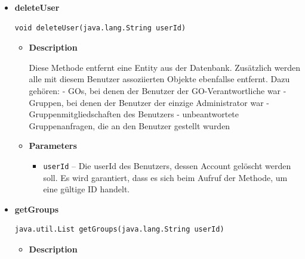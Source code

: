 \documentclass[11pt,a4paper]{report}
\begin{document}
{{{{{{{{{{{{\begin{itemize}
{\begin{itemize}
{Die Methode fügt eine neue UserEntity in die Datenbank ein.
}
\item{
{\bf  Parameters}
  \begin{itemize}
   \item{
\texttt{user} -- Die Entity, die in die Datenbank eingefügt werden soll. Dieses Objekt muss eine in der Datenbank noch nicht vorhandene ID enthalten, sonst schlägt die Ausführung fehl.}
  \end{itemize}
}%
\end{itemize}
}%
\item{ 
\hypertarget{edu.kit.pse17.go_app.PersistenceLayer.daos.UserDao.deleteUser(java.lang.String)}{{\bf  deleteUser}\\}
\begin{lstlisting}[frame=none]
void deleteUser(java.lang.String userId)\end{lstlisting} %
\begin{itemize}
\item{
{\bf  Description}

Diese Methode entfernt eine Entity aus der Datenbank. Zusätzlich werden alle mit diesem Benutzer assoziierten Objekte ebenfallse entfernt. Dazu gehören: - GOs, bei denen der Benutzer der GO-Verantwortliche war - Gruppen, bei denen der Benutzer der einzige Administrator war - Gruppenmitgliedschaften des Benutzers - unbeantwortete Gruppenanfragen, die an den Benutzer gestellt wurden
}
\item{
{\bf  Parameters}
  \begin{itemize}
   \item{
\texttt{userId} -- Die userId des Benutzers, dessen Account gelöscht werden soll. Es wird garantiert, dass es sich beim Aufruf der Methode, um eine gültige ID handelt.}
  \end{itemize}
}%
\end{itemize}
}%
\item{ 
\hypertarget{edu.kit.pse17.go_app.PersistenceLayer.daos.UserDao.getGroups(java.lang.String)}{{\bf  getGroups}\\}
\begin{lstlisting}[frame=none]
java.util.List getGroups(java.lang.String userId)\end{lstlisting} %
\begin{itemize}
\item{
{\bf  Description}

}
\end{itemize}}
\end{itemize}}}}}}}}}}}}}
\end{document}
